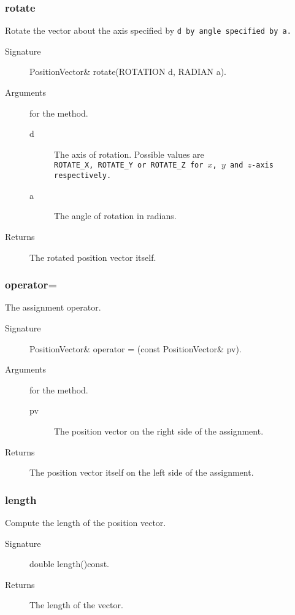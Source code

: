 \subsubsection{rotate} 
Rotate the vector about the  axis specified by \tt d \rm by angle
specified by \tt a\rm.
 \begin{description} 
    \item [Signature] PositionVector\& rotate(ROTATION d, RADIAN a). 
    \item [Arguments] for the method.
      \begin{description}
        \item [d] The axis of rotation. Possible values are \\
                  \tt ROTATE\_X\rm, \tt ROTATE\_Y \rm
                  or \tt ROTATE\_Z \rm for $x$, $y$ and 
                  $z$-axis respectively. 
        \item [a] The angle of rotation in radians.
      \end{description}
    \item [Returns] The rotated position vector itself.
 \end{description}

\subsubsection{operator=}
The assignment operator. 
    \begin{description}
       \item [Signature] PositionVector\& operator = (const
    PositionVector\& pv). 
       \item [Arguments] for the method.
          \begin{description}
             \item[pv] The position vector on the right side of the
    assignment.
           \end{description}
       \item [Returns] The position vector itself on the left side of the assignment.
    \end{description}

\subsubsection{length}
 Compute the length of the position vector.
   \begin{description}
       \item [Signature] double length()const.
       \item [Returns] The length of the vector.
   \end{description} 

